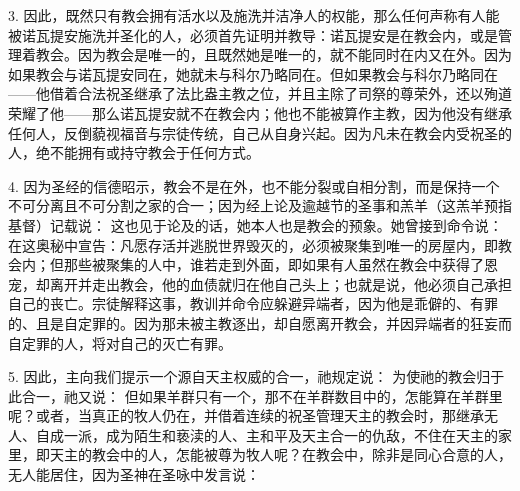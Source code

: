 3. 因此，既然只有教会拥有活水以及施洗并洁净人的权能，那么任何声称有人能被诺瓦提安施洗并圣化的人，必须首先证明并教导：诺瓦提安是在教会内，或是管理着教会。因为教会是唯一的，且既然她是唯一的，就不能同时在内又在外。因为如果教会与诺瓦提安同在，她就未与科尔乃略同在。但如果教会与科尔乃略同在——他借着合法祝圣继承了法比盎主教之位，并且主除了司祭的尊荣外，还以殉道荣耀了他——那么诺瓦提安就不在教会内；他也不能被算作主教，因为他没有继承任何人，反倒藐视福音与宗徒传统，自己从自身兴起。因为凡未在教会内受祝圣的人，绝不能拥有或持守教会于任何方式。\par

4. 因为圣经的信德昭示，教会不是在外，也不能分裂或自相分割，而是保持一个不可分离且不可分割之家的合一；因为经上论及逾越节的圣事和羔羊（这羔羊预指基督）记载说： 这也见于论及的话，她本人也是教会的预象。她曾接到命令说： 在这奥秘中宣告：凡愿存活并逃脱世界毁灭的，必须被聚集到唯一的房屋内，即教会内；但那些被聚集的人中，谁若走到外面，即如果有人虽然在教会中获得了恩宠，却离开并走出教会，他的血债就归在他自己头上；也就是说，他必须自己承担自己的丧亡。宗徒解释这事，教训并命令应躲避异端者，因为他是乖僻的、有罪的、且是自定罪的。因为那未被主教逐出，却自愿离开教会，并因异端者的狂妄而自定罪的人，将对自己的灭亡有罪。\par

5. 因此，主向我们提示一个源自天主权威的合一，祂规定说： 为使祂的教会归于此合一，祂又说： 但如果羊群只有一个，那不在羊群数目中的，怎能算在羊群里呢？或者，当真正的牧人仍在，并借着连续的祝圣管理天主的教会时，那继承无人、自成一派，成为陌生和亵渎的人、主和平及天主合一的仇敌，不住在天主的家里，即天主的教会中的人，怎能被尊为牧人呢？在教会中，除非是同心合意的人，无人能居住，因为圣神在圣咏中发言说：\par

